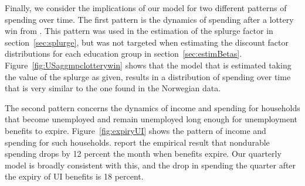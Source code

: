 \documentclass[\econtexRoot/HAFiscal]{subfiles}
\begin{document}
Finally, we consider the implications of our model for two different patterns of spending over time.
The first pattern is the dynamics of spending after a lottery win from \citeauthor{fagereng_mpc_2021}.
This pattern was used in the estimation of the splurge factor in section~\ref{sec:splurge}, but was not targeted when estimating the discount factor distributions for each education group in section~\ref{sec:estimBetas}.
Figure~\ref{fig:USaggmpclotterywin} shows that the model that is estimated taking the value of the splurge as given, results in a distribution of spending over time that is very similar to the one found in the Norwegian data.


The second pattern concerns the dynamics of income and spending for households that become unemployed and remain unemployed long enough for unemployment benefits to expire.
Figure~\ref{fig:expiryUI} shows the pattern of income and spending for such households.
\citet{ganongConsumer2019} report the empirical result that nondurable spending drops by 12 percent the month when benefits expire.
Our quarterly model is broadly consistent with this, and the drop in spending the quarter after the expiry of UI benefits is 18 percent.


\end{document}
